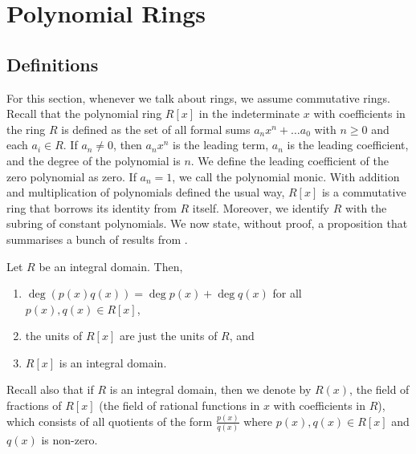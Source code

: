 \section{Polynomial Rings}

\subsection{Definitions}

For this section, whenever we talk about rings, we assume commutative rings. Recall that the polynomial ring $R[x]$ in the indeterminate $x$ with coefficients in the ring $R$ is defined as the set of all formal sums $a_nx^n + \ldots a_0$ with $n \geq 0$ and each $a_i \in R$. If $a_n \neq 0$, then $a_n x^n$ is the leading term, $a_n$ is the leading coefficient, and the degree of the polynomial is $n$. We define the leading coefficient of the zero polynomial as zero. If $a_n = 1$, we call the polynomial monic. With addition and multiplication of polynomials defined the usual way, $R[x]$ is a commutative ring that borrows its identity from $R$ itself. Moreover, we identify $R$ with the subring of constant polynomials. We now state, without proof, a proposition that summarises a bunch of results from .

\begin{prop} \label{prop:poly-summary}
    Let $R$ be an integral domain. Then,
    \begin{enumerate}
        \item $\deg (p(x) q(x)) = \deg p(x) + \deg q(x)$ for all $p(x), q(x) \in R[x]$,
        \item the units of $R[x]$ are just the units of $R$, and
        \item $R[x]$ is an integral domain.
    \end{enumerate}
\end{prop}

Recall also that if $R$ is an integral domain, then we denote by $R(x)$, the field of fractions of $R[x]$ (the field of rational functions in $x$ with coefficients in $R$), which consists of all quotients of the form $\frac{p(x)}{q(x)}$ where $p(x), q(x) \in R[x]$ and $q(x)$ is non-zero.

